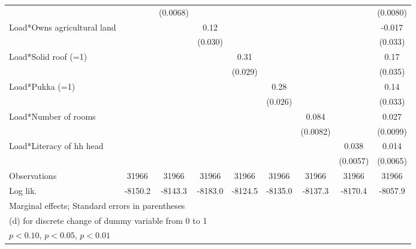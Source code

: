 \begin{table}[htbp]
\begin{tabular*}{1\hsize}{@{\hskip\tabcolsep\extracolsep\fill}l*{8}{c}}
                &                  & (0.0068)         &                  &                  &                  &                  &                  & (0.0080)         \\
Load*Owns agricultural land&                  &                  &     0.12\sym{***}&                  &                  &                  &                  &   -0.017         \\
                &                  &                  &  (0.030)         &                  &                  &                  &                  &  (0.033)         \\
Load*Solid roof (=1)&                  &                  &                  &     0.31\sym{***}&                  &                  &                  &     0.17\sym{***}\\
                &                  &                  &                  &  (0.029)         &                  &                  &                  &  (0.035)         \\
Load*Pukka (=1) &                  &                  &                  &                  &     0.28\sym{***}&                  &                  &     0.14\sym{***}\\
                &                  &                  &                  &                  &  (0.026)         &                  &                  &  (0.033)         \\
Load*Number of rooms&                  &                  &                  &                  &                  &    0.084\sym{***}&                  &    0.027\sym{***}\\
                &                  &                  &                  &                  &                  & (0.0082)         &                  & (0.0099)         \\
Load*Literacy of hh head&                  &                  &                  &                  &                  &                  &    0.038\sym{***}&    0.014\sym{**} \\
                &                  &                  &                  &                  &                  &                  & (0.0057)         & (0.0065)         \\
\midrule
Observations    &    31966         &    31966         &    31966         &    31966         &    31966         &    31966         &    31966         &    31966         \\
Log lik.        &  -8150.2         &  -8143.3         &  -8183.0         &  -8124.5         &  -8135.0         &  -8137.3         &  -8170.4         &  -8057.9         \\
\bottomrule
\multicolumn{9}{l}{\footnotesize Marginal effects; Standard errors in parentheses}\\
\multicolumn{9}{l}{\footnotesize  (d) for discrete change of dummy variable from 0 to 1}\\
\multicolumn{9}{l}{\footnotesize \sym{*} \(p<0.10\), \sym{**} \(p<0.05\), \sym{***} \(p<0.01\)}\\
\end{tabular*}
\end{table}
